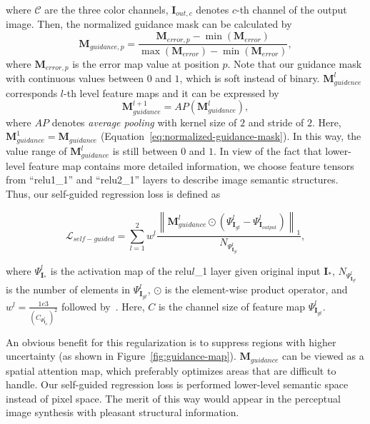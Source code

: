 \documentclass[journal]{IEEEtran}
\begin{document}
where ${\mathcal C}$ are the three color channels, $\mathbf{I}_{out,c}$ denotes $c$-th channel of the output image. Then, the normalized guidance mask can be calculated by
\begin{equation}\label{eq:normalized-guidance-mask}
{\mathbf{M}_{guidance,p}} = \frac{{{\mathbf{M}_{error,p}} - \min \left( {{\mathbf{M}_{error}}} \right)}}{{\max \left( {{\mathbf{M}_{error}}} \right) - \min \left( {{\mathbf{M}_{error}}} \right)}},
\end{equation}
where ${{\mathbf{M}_{error,p}}}$ is the error map value at position $p$. Note that our guidance mask with continuous values between $0$ and $1$, which is soft instead of binary. $\mathbf{M}_{guidence}^l$ corresponds $l$-th level feature maps and it can be expressed by
\begin{equation}\label{eq:l-th-guidance-map}
\mathbf{M}_{guidance}^{l + 1} = AP\left( {\mathbf{M}_{guidance}^l} \right),
\end{equation}
where $AP$ denotes \emph{average pooling} with kernel size of $2$ and stride of $2$. Here, $\mathbf{M}_{guidance}^1 = {\mathbf{M}_{guidance}}$ (Equation~\ref{eq:normalized-guidance-mask}). In this way, the value range of $\mathbf{M}_{guidance}^l$ is still between $0$ and $1$. In view of the fact that lower-level feature map contains more detailed information, we choose feature tensors from ``relu1\_1'' and ``relu2\_1'' layers to describe image semantic structures. Thus, our self-guided regression loss is defined as
\begin{small}
	\begin{equation}\label{eq:self-guided-loss}
	{{\mathcal L}_{self - guided}} = \sum\limits_{l = 1}^2 {{w^l}\frac{{{{\left\| {\mathbf{M}_{guidance}^l \odot \left( {\Psi _{{\mathbf{I}_{gt}}}^l - \Psi _{{\mathbf{I}_{output}}}^l} \right)} \right\|}_1}}}{{{N_{\Psi _{{\mathbf{I}_{gt}}}^l}}}}} ,
	\end{equation}
\end{small}
where $\Psi _{{\mathbf{I}_ * }}^{l}$ is the activation map of the relu$l$\_1 layer given original input ${\mathbf{I}_ * }$, ${{N_{\Psi _{{\mathbf{I}_{gt}}}^l}}}$ is the number of elements in ${\Psi _{{\mathbf{I}_{gt}}}^{l}}$, $ \odot $ is the element-wise product operator, and ${w^l} = \frac{{1e3}}{{{{\left( {{C_{\Psi _{{\mathbf{I}_{gt}}}^{l}}}} \right)}^2}}}$ followed by~\cite{non-stationary}. Here, $C$ is the channel size of feature map $\Psi _{{\mathbf{I}_{gt}}}^{l}$. 

An obvious benefit for this regularization is to suppress regions with higher uncertainty (as shown in Figure~\ref{fig:guidance-map}). ${\mathbf{M}_{guidance}}$ can be viewed as a spatial attention map, which preferably optimizes areas that are difficult to handle. Our self-guided regression loss is performed lower-level semantic space instead of pixel space. The merit of this way would appear in the perceptual image synthesis with pleasant structural information.
\end{document}
